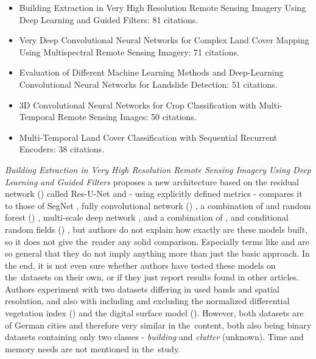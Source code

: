 \begin{itemize}
	\item Building Extraction in Very High Resolution Remote Sensing Imagery Using Deep Learning and Guided Filters: 81 citations. \cite{res-u-net}
	\item Very Deep Convolutional Neural Networks for Complex Land Cover Mapping Using Multispectral Remote Sensing Imagery: 71 citations. \cite{very-deep-cnn-lc}
	\item Evaluation of Different Machine Learning Methods and Deep-Learning Convolutional Neural Networks for Landslide Detection: 51 citations. \cite{landslide-evaluation}
	\item 3D Convolutional Neural Networks for Crop Classification with Multi-Temporal Remote Sensing Images: 50 citations. \cite{3d-cnn-crop}
	\item Multi-Temporal Land Cover Classification with Sequential Recurrent Encoders: 38 citations. \cite{multi-temporal-sequential-recurrent}
\end{itemize}

\textit{Building Extraction in Very High Resolution Remote Sensing Imagery Using Deep Learning and Guided Filters} proposes a new  architecture based on the residual network () \cite{resnet} called Res-U-Net and - using explicitly defined metrics - compares it to those of SegNet \cite{segnet}, fully convolutional network () \cite{fcn}, a combination of  and random forest () \cite{rf}, multi-scale deep network \cite{hierarchical-labeling}, and a combination of ,  and conditional random fields () \cite{hierarchical-labeling}, but authors do not explain how exactly are these models built, so it does not give the~reader any solid comparison. Especially terms like  and  are so general that they do not imply anything more than just the basic approach. In the end, it is not even sure whether authors have tested these models on the~datasets on their own, or if they just report results found in other articles. Authors experiment with two datasets differing in used bands and spatial resolution, and also with including and excluding the normalized differential vegetation index () and the digital surface model (). However, both datasets are of German cities and therefore very similar in the~content, both also being binary datasets containing only two classes - \textit{building} and \textit{clutter} (unknown). Time and memory needs are not mentioned in the~study.

